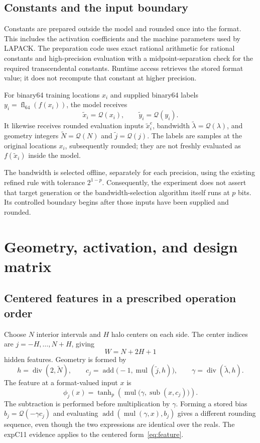 \documentclass[11pt]{article}
\newcommand{\Q}{\mathcal Q}
\newcommand{\add}{\operatorname{add}}
\newcommand{\sub}{\operatorname{sub}}
\newcommand{\mul}{\operatorname{mul}}
\newcommand{\dv}{\operatorname{div}}
\newcommand{\tp}{\operatorname{tanh}_{p}}
\newcommand{\fl}{\operatorname{fl}}
\begin{document}
\subsection{Constants and the input boundary}
Constants are prepared outside the model and rounded once into the format.
This includes the activation coefficients and the machine parameters used by
LAPACK. The preparation code uses exact rational arithmetic for rational
constants and high-precision evaluation with a midpoint-separation check for
the required transcendental constants. Runtime access retrieves the stored
format value; it does not recompute that constant at higher precision.

For binary64 training locations $x_i$ and supplied binary64 labels
$y_i=\fl_{64}(f(x_i))$, the model receives
\[
 \widetilde x_i=\Q(x_i),\qquad
 \widetilde y_i=\Q(y_i).
\]
It likewise receives rounded evaluation inputs $\widetilde x^e_i$, bandwidth
$\widetilde\lambda=\Q(\lambda)$, and geometry integers
$\widetilde N=\Q(N)$ and $\widetilde j=\Q(j)$. The labels are samples at
the original locations $x_i$, subsequently rounded; they are not freshly
evaluated as $f(\widetilde x_i)$ inside the model.

The bandwidth is selected offline, separately for each precision, using the
existing refined rule with tolerance $2^{1-p}$. Consequently, the experiment
does not assert that target generation or the bandwidth-selection algorithm
itself runs at $p$ bits. Its controlled boundary begins after those inputs
have been supplied and rounded.

\section{Geometry, activation, and design matrix}

\subsection{Centered features in a prescribed operation order}
Choose $N$ interior intervals and $H$ halo centers on each side. The center
indices are $j=-H,\ldots,N+H$, giving
\[
 W=N+2H+1
\]
hidden features. Geometry is formed by
\begin{equation}\label{eq:geometry}
 h=\dv(2,\widetilde N),\qquad
 c_j=\add\bigl(-1,\mul(\widetilde j,h)\bigr),\qquad
 \gamma=\dv(\widetilde\lambda,h).
\end{equation}
The feature at a format-valued input $x$ is
\begin{equation}\label{eq:feature}
 \phi_j(x)=\tp\!\left(\mul\bigl(\gamma,\sub(x,c_j)\bigr)\right).
\end{equation}
The subtraction is performed before multiplication by $\gamma$. Forming a
stored bias $b_j=\Q(-\gamma c_j)$ and evaluating
$\add(\mul(\gamma,x),b_j)$ gives a different rounding sequence, even though
the two expressions are identical over the reals. The expC11 evidence applies
to the centered form~\eqref{eq:feature}.
\end{document}
